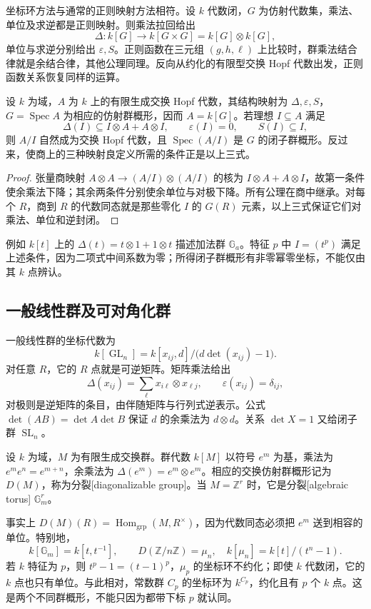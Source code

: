 坐标环方法与通常的正则映射方法相符。设 \(k\) 代数闭，\(G\) 为仿射代数集，乘法、单位及求逆都是正则映射。则乘法拉回给出
\[
	\Delta:k[G]\to k[G\times G]=k[G]\otimes k[G],
\]
单位与求逆分别给出 \(\varepsilon,S\)。正则函数在三元组 \((g,h,\ell)\) 上比较时，群乘法结合律就是余结合律，其他公理同理。反向从约化的有限型交换 Hopf 代数出发，正则函数关系恢复同样的运算。
\begin{proposition}\label{b5:prop:hopf-ideals-subgroups}
	设 \(k\) 为域，\(A\) 为 \(k\) 上的有限生成交换 Hopf 代数，其结构映射为 \(\Delta,\varepsilon,S\)，\(G=\operatorname{Spec}A\) 为相应的仿射群概形，因而 \(A=k[G]\)。若理想 \(I\subseteq A\) 满足
	\[
		\Delta(I)\subseteq I\otimes A+A\otimes I,\qquad \varepsilon(I)=0,\qquad S(I)\subseteq I,
	\]
	则 \(A/I\) 自然成为交换 Hopf 代数，且 \(\operatorname{Spec}(A/I)\) 是 \(G\) 的闭子群概形。反过来，使商上的三种映射良定义所需的条件正是以上三式。
\end{proposition}
\begin{proof}
	张量商映射 \(A\otimes A\to(A/I)\otimes(A/I)\) 的核为 \(I\otimes A+A\otimes I\)，故第一条件使余乘法下降；其余两条件分别使余单位与对极下降。所有公理在商中继承。对每个 \(R\)，商到 \(R\) 的代数同态就是那些零化 \(I\) 的 \(G(R)\) 元素，以上三式保证它们对乘法、单位和逆封闭。
\end{proof}
例如 \(k[t]\) 上的 \(\Delta(t)=t\otimes1+1\otimes t\) 描述加法群 \(\mathbb G_a\)。特征 \(p\) 中 \(I=(t^p)\) 满足上述条件，因为二项式中间系数为零；所得闭子群概形有非零幂零坐标，不能仅由其 \(k\) 点辨认。

\subsection{一般线性群及可对角化群}
\label{b5:subsec:2102:03}

一般线性群的坐标代数为
\[
	k[\operatorname{GL}_n] =k[x_{ij},d]/\bigl(d\det(x_{ij})-1\bigr).
\]
对任意 \(R\)，它的 \(R\) 点就是可逆矩阵。矩阵乘法给出
\[
	\Delta(x_{ij})=\sum_\ell x_{i\ell}\otimes x_{\ell j}, \qquad \varepsilon(x_{ij})=\delta_{ij},
\]
对极则是逆矩阵的条目，由伴随矩阵与行列式逆表示。公式 \(\det(AB)=\det A\det B\) 保证 \(d\) 的余乘法为 \(d\otimes d\)。关系 \(\det X=1\) 又给闭子群 \(\operatorname{SL}_n\)。
\begin{definition}\label{b5:def:diagonalizable-group}
	设 \(k\) 为域，\(M\) 为有限生成交换群。群代数 \(k[M]\) 以符号 \(e^m\) 为基，乘法为 \(e^me^n=e^{m+n}\)，余乘法为 \(\Delta(e^m)=e^m\otimes e^m\)。相应的交换仿射群概形记为 \(D(M)\)，称为分裂[diagonalizable group]。当 \(M=\mathbb Z^r\) 时，它是分裂[algebraic torus] \(\mathbb G_m^r\)。
\end{definition}
事实上 \(D(M)(R)=\operatorname{Hom}_{\mathrm{grp}}(M,R^\times)\)，因为代数同态必须把 \(e^m\) 送到相容的单位。特别地，
\[
	k[\mathbb G_m]=k[t,t^{-1}],\qquad D(\mathbb Z/n\mathbb Z)=\mu_n,\quad k[\mu_n]=k[t]/(t^n-1).
\]
若 \(k\) 特征为 \(p\)，则 \(t^p-1=(t-1)^p\)，\(\mu_p\) 的坐标环不约化；即使 \(k\) 代数闭，它的 \(k\) 点也只有单位。与此相对，常数群 \(C_p\) 的坐标环为 \(k^{C_p}\)，约化且有 \(p\) 个 \(k\) 点。这是两个不同群概形，不能只因为都带下标 \(p\) 就认同。

